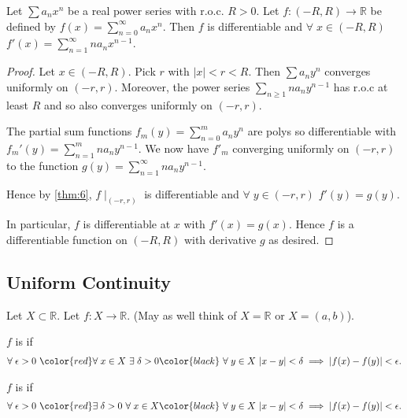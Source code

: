    \begin{theorem} \label{thm:11}
        Let $\sum a_n x^n$ be a real power series with r.o.c. $R > 0$.
        Let $f : (-R, R) \to \mathbb{R}$ be defined by $f(x) = \sum_{n=0}^{\infty} a_n x^n$.
        Then $f$ is differentiable and $\forall \; x \in (-R, R)$ $f'(x) = \sum_{n=1}^{\infty} n a_n x^{n - 1}$.
    \end{theorem} 

    \begin{proof}
        Let $x \in (-R, R)$.
        Pick $r$ with $|x| < r < R$.
        Then $\sum a_n y^n$ converges uniformly on $(-r, r)$.
        Moreover, the power series $\sum_{n \geq 1} n a_n y^{n - 1}$ has r.o.c at least $R$ and so also converges uniformly on $(-r, r)$.

        The partial sum functions $f_m(y) = \sum_{n=0}^{m} a_n y^n$ are polys so differentiable with $f_m'(y) = \sum_{n=1}^{m} n a_n y^{n - 1}$.
        We now have $f'_m$ converging uniformly on $(-r, r)$ to the function $g(y) = \sum_{n=1}^{\infty} n a_n y^{n - 1}$.

        Hence by \cref{thm:6}, $f \mid_{(-r, r)}$ is differentiable and $\forall \; y \in (-r, r)$ $f'(y) = g(y)$.

        In particular, $f$ is differentiable at $x$ with $f'(x) = g(x)$.
        Hence $f$ is a differentiable function on $(-R, R)$ with derivative $g$ as desired.
    \end{proof} 

    \subsection{Uniform Continuity}
    Let $X \subset \mathbb{R}$.
    Let $f: X \to \mathbb{R}$.
    (May as well think of $X = \mathbb{R}$ or $X = (a, b)$).

    \begin{definition}
        $f$ is  if 
        \begin{align*}
            \forall \; \epsilon > 0 \ \color{red} \forall \; x \in X \ \exists \; \delta > 0 \color{black} \ \forall \; y \in X \ |x - y| < \delta \implies |f(x) - f(y)| < \epsilon.
        \end{align*} 
    \end{definition} 

    \begin{definition}
        $f$ is  if 
        \begin{align*}
            \forall \; \epsilon > 0 \ \color{red} \exists \; \delta > 0 \ \forall \; x \in X \color{black} \ \forall \; y \in X \ |x - y| < \delta \implies |f(x) - f(y)| < \epsilon.
        \end{align*} 
    \end{definition} 

